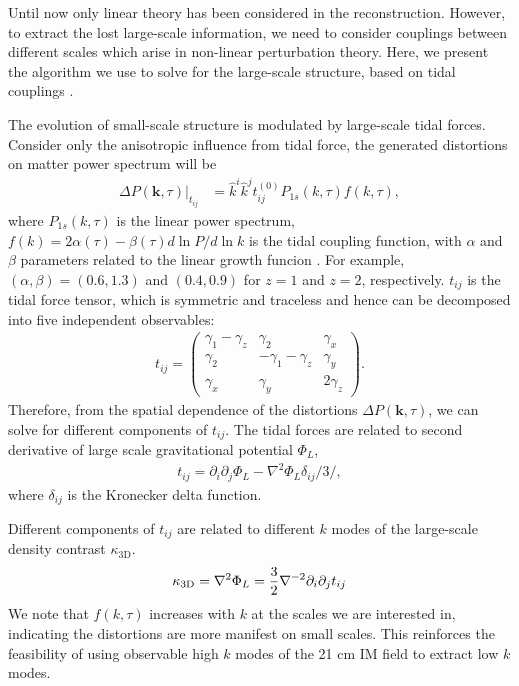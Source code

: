 Until now only linear theory has been considered in the reconstruction. However, to extract the lost large-scale information, we need to consider couplings between different scales which arise in non-linear perturbation theory. 
Here, we present the algorithm we use to solve for the large-scale structure, based on tidal couplings \cite{2015:zhu,2012:pen}.  

The evolution of small-scale structure is modulated by large-scale tidal forces. Consider only the anisotropic influence from tidal force, the generated distortions on matter power spectrum will be 
\begin{align}
\label{eq:powerdistort}
\Delta P(\bm{k},\tau)|_{t_{ij}} &=
\hat{k}^i\hat{k}^jt_{ij}^{(0)}P_{1s}(k,\tau)f(k,\tau),
\end{align}
where $P_{1s}(k,\tau)$ is the linear power spectrum, $f(k)=2\alpha(\tau)-\beta(\tau)d\ln P/d\ln k$ is the tidal coupling function, with $\alpha$ and $\beta$ parameters related to the linear growth funcion \cite{2015:zhu}. For example, $(\alpha,\beta)=(0.6,1.3)$ and $(0.4, 0.9)$ for $z=1$ and $z=2$, respectively. 
$t_{ij}$ is the tidal force tensor, which is symmetric and traceless and hence can be decomposed into five independent observables:  
\begin{eqnarray}
t_{ij}=\left( \begin{array}{ccc}
\gamma_{1}-\gamma_{z} & \gamma_{2} & \gamma_{x}\\
\gamma_{2} & -\gamma_{1}-\gamma_{z} & \gamma_{y}\\
\gamma_{x} & \gamma_{y} & 2\gamma_z
\end{array} \right).
\end{eqnarray}
Therefore, from the spatial dependence of the distortions $\Delta P(\bm{k},\tau)$, we can solve for different components of $t_{ij}$. The tidal forces are related to second derivative of large scale gravitational potential $\Phi_L$,  
\begin{eqnarray}
\label{eq:tij}
t_{ij}=\partial_i\partial_j\Phi_{L}-\nabla^2\Phi_L\delta_{ij}/3 /,
\end{eqnarray}
where $\delta_{ij}$ is the Kronecker delta function.

Different components of $t_{ij}$ are related to different $k$ modes of the large-scale density contrast $\kappa_\mathrm{3D}$.
\begin{eqnarray}
    \label{eq:largepoten}
    \kappa_\mathrm{3D}=\nabla^2\Phi_L=\frac{3}{2}\nabla^{-2}\partial_i\partial_j t_{ij}
\end{eqnarray}
We note that $f(k,\tau)$ increases with $k$ at the scales we are interested in, indicating the distortions are more manifest on small scales. This reinforces the feasibility of using observable high $k$ modes of the 21 cm IM field to extract low $k$ modes. 

